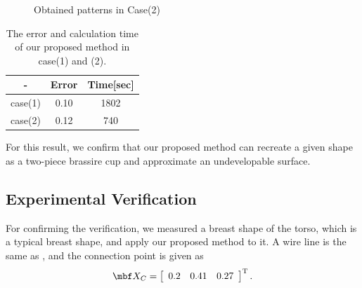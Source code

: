 \documentclass[E]{scitrans}
\begin{document}
\begin{figure}[!h]
	\centering
	\hfil
	
	\caption{Obtained patterns in Case(2)}
	\label{fig:ObtainedSurfaceNDS_Pat}
\end{figure}

\begin{table}[h]
	\centering
	\caption{The error and calculation time of our proposed method in case(1) and (2).}
	\label{tbl:error and calc_Example}
	\begin{tabular}{|c|c|c|} \hline
		-& Error & Time[sec] \\ \hline
		case(1) & 0.10 & 1802 \\ \hline
		case(2) & 0.12 & 740 \\ \hline
	\end{tabular}
\end{table}
For this result, we confirm that our proposed method can recreate a given shape as a two-piece brassire cup and approximate an undevelopable surface.

\subsection*{Experimental Verification}
For confirming the verification, we measured a breast shape of the torso, which is a typical breast shape, and apply our proposed method to it. A wire line is the same as , and the connection point is given as 
\begin{equation}\label{eq:givenXc2}
	\mbold{X}_C = \left[ \begin{array}{ccc}
	0.2 & 0.41 & 0.27
	\end{array}\right]^\mathrm{T}.
\end{equation}
\end{document}
